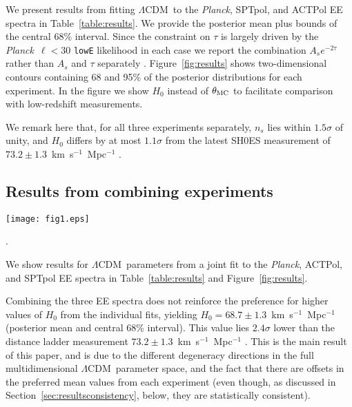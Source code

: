 \documentclass[twocolumn]{aastex63}
\newcommand{\planck}{\textsl{Planck}}
\newcommand{\lcdm}{\ensuremath{\Lambda\mathrm{CDM}}}
\begin{document}
We present results from fitting \lcdm\ to the \planck, SPTpol, and ACTPol EE spectra in Table~\ref{table:results}. We provide the posterior mean plus bounds of the central 68\% interval. Since the constraint on $\tau$ is largely driven by the \planck\ $\ell<30$ \texttt{lowE} likelihood in each case we report the combination $A_se^{-2\tau}$ rather than $A_s$ and $\tau$ separately \citep{kosowsky/milosavljevic/jiminez:2002}. Figure~\ref{fig:results} shows two-dimensional contours containing 68 and 95\% of the posterior distributions for each experiment. In the figure we show $H_0$ instead of $\theta_{\rm MC}$ to facilitate comparison with low-redshift measurements.

We remark here that, for all three experiments separately, $n_s$ lies within $1.5\sigma$ of unity, and $H_0$ differs by at most $1.1\sigma$ from the latest SH0ES measurement of $73.2\pm1.3$~km~s$^{-1}$~Mpc$^{-1}$ \citep{riess/etal:2021}.

\subsection{Results from combining experiments}
\label{sec:resultscombined}

\begin{figure*}
\centering
\texttt{[image: fig1.eps]}
\caption{Lower triangle: contours containing 68\% and 95\% of the posterior distribution from fits to EE power spectra in \lcdm. Combining the \planck, ACTPol, and SPTpol EE spectra does not reinforce the preference for higher values of $H_0$ from the data sets individually, due to different degeneracy directions, for example in the $n_s-\Omega_bh^2$ plane. Dashed lines at $H_0=73$~km~s$^{-1}$~Mpc$^{-1}$ and $n_s=0.99$ correspond to a point in parameter space that is allowed within the 68\% contours of each experiment individually but disfavored at $3\sigma$ in the combination. Each constraint includes the \planck\ \texttt{lowE} likelihood to constrain $\tau$. Upper triangle: effect of fixing the ACTPol polarization efficiency parameter, $y_p$, as discussed in Section~\ref{sec:resultsconsistencygauss}.}.
\label{fig:results}
\end{figure*}

We show results for \lcdm\ parameters from a joint fit to the \planck, ACTPol, and SPTpol EE spectra in Table~\ref{table:results} and Figure~\ref{fig:results}.

Combining the three EE spectra does not reinforce the preference for higher values of $H_0$ from the individual fits, yielding $H_0=68.7\pm1.3$~km~s$^{-1}$~Mpc$^{-1}$ (posterior mean and central 68\% interval). This value lies $2.4\sigma$ lower than the distance ladder measurement $73.2\pm1.3$~km~s$^{-1}$~Mpc$^{-1}$ \citep{riess/etal:2021}. This is the main result of this paper, and is due to the different degeneracy directions in the full multidimensional \lcdm\ parameter space, and the fact that there are offsets in the preferred mean values from each experiment (even though, as discussed in Section~\ref{sec:resultsconsistency}, below, they are statistically consistent).
\end{document}
